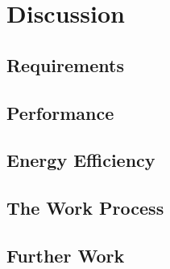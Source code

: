 \section{Discussion}

\subsection{Requirements}

\subsection{Performance}

\subsection{Energy Efficiency}

\subsection{The Work Process}

\subsection{Further Work}
